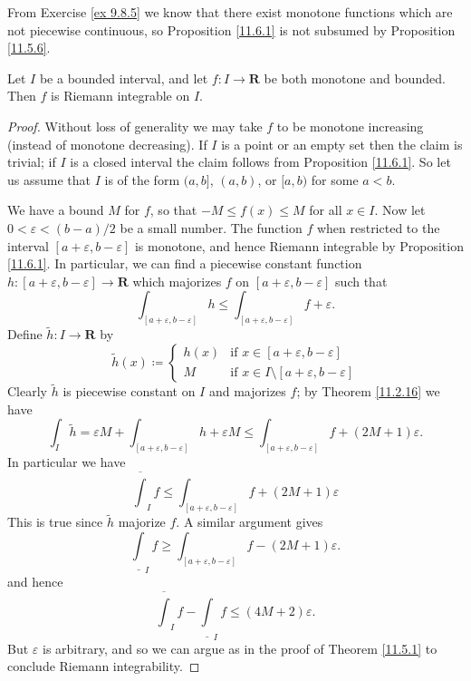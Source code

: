 \begin{remark}\label{11.6.2}
    From Exercise \ref{ex 9.8.5} we know that there exist monotone functions which are not piecewise continuous, so Proposition \ref{11.6.1} is not subsumed by Proposition \ref{11.5.6}.
\end{remark}

\begin{corollary}\label{11.6.3}
    Let \(I\) be a bounded interval, and let \(f : I \to \mathbf{R}\) be both monotone and bounded.
    Then \(f\) is Riemann integrable on \(I\).
\end{corollary}

\begin{proof}
    Without loss of generality we may take \(f\) to be monotone increasing (instead of monotone decreasing).
    If \(I\) is a point or an empty set then the claim is trivial;
    if \(I\) is a closed interval the claim follows from Proposition \ref{11.6.1}.
    So let us assume that \(I\) is of the form \((a, b]\), \((a, b)\), or \([a, b)\) for some \(a < b\).

    We have a bound \(M\) for \(f\), so that \(-M \leq f(x) \leq M\) for all \(x \in I\).
    Now let \(0 < \varepsilon < (b - a) / 2\) be a small number.
    The function \(f\) when restricted to the interval \([a + \varepsilon, b - \varepsilon]\) is monotone, and hence Riemann integrable by Proposition \ref{11.6.1}.
    In particular, we can find a piecewise constant function \(h : [a + \varepsilon, b - \varepsilon] \to \mathbf{R}\) which majorizes \(f\) on \([a + \varepsilon, b - \varepsilon]\) such that
    \[
        \int_{[a + \varepsilon, b - \varepsilon]} h \leq \int_{[a + \varepsilon, b - \varepsilon]} f + \varepsilon.
    \]
    Define \(\tilde{h} : I \to \mathbf{R}\) by
    \[
        \tilde{h}(x) \coloneqq \begin{cases}
            h(x) & \text{if } x \in [a + \varepsilon, b - \varepsilon]             \\
            M    & \text{if } x \in I \setminus [a + \varepsilon, b - \varepsilon]
        \end{cases}
    \]
    Clearly \(\tilde{h}\) is piecewise constant on \(I\) and majorizes \(f\);
    by Theorem \ref{11.2.16} we have
    \[
        \int_I \tilde{h} = \varepsilon M + \int_{[a + \varepsilon, b - \varepsilon]} h + \varepsilon M \leq \int_{[a + \varepsilon, b - \varepsilon]} f + (2M + 1) \varepsilon.
    \]
    In particular we have
    \[
        \overline{\int}_I f \leq \int_{[a + \varepsilon, b - \varepsilon]} f + (2M + 1) \varepsilon
    \]
    This is true since \(\tilde{h}\) majorize \(f\).
    A similar argument gives
    \[
        \underline{\int}_I f \geq \int_{[a + \varepsilon, b - \varepsilon]} f - (2M + 1) \varepsilon.
    \]
    and hence
    \[
        \overline{\int}_I f - \underline{\int}_I f \leq (4M + 2) \varepsilon.
    \]
    But \(\varepsilon\) is arbitrary, and so we can argue as in the proof of Theorem \ref{11.5.1} to conclude Riemann integrability.
\end{proof}

